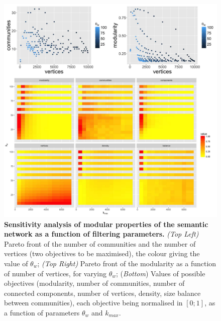 \documentclass[10pt]{article}
\begin{document}
\begin{figure}
\includegraphics[width=\linewidth]{A-quantepistemo-sensitivity.jpg}
\caption{\textbf{Sensitivity analysis of modular properties of the semantic network as a function of filtering parameters.} \textit{(Top Left)} Pareto front of the number of communities and the number of vertices (two objectives to be maximised), the colour giving the value of $\theta_w$; \textit{(Top Right)} Pareto front of the modularity as a function of number of vertices, for varying $\theta_w$; (\textit{Bottom}) Values of possible objectives (modularity, number of communities, number of connected components, number of vertices, density, size balance between communities), each objective being normalised in $\left[0;1\right]$, as a function of parameters $\theta_w$ and $k_{max}$.\label{fig:sensitivity}}
\end{figure}
\end{document}
